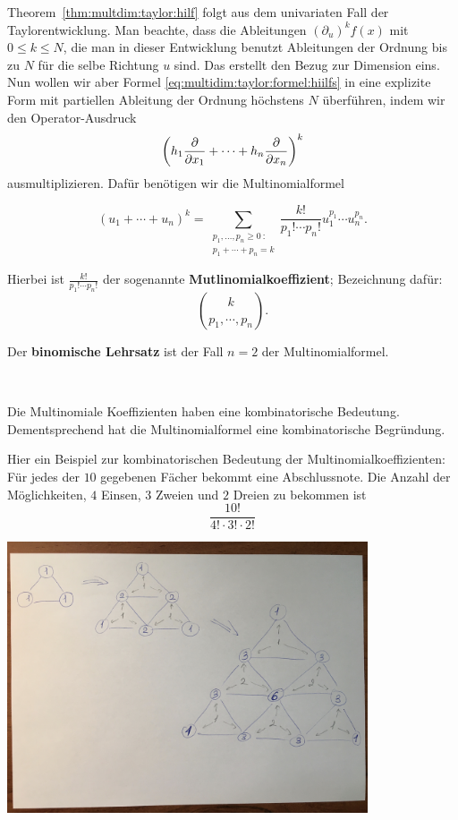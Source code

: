 \begin{bem}
	Theorem~\ref{thm:multdim:taylor:hilf} folgt aus dem univariaten Fall der Taylorentwicklung. Man beachte, dass die Ableitungen $(\partial_u)^k f(x)$ mit $0 \le k \le N$, die man in dieser Entwicklung benutzt Ableitungen der Ordnung bis zu $N$ für die selbe Richtung $u$ sind. Das erstellt den Bezug zur Dimension eins. Nun wollen wir aber Formel \eqref{eq:multidim:taylor:formel:hiilfs} in eine explizite Form mit partiellen Ableitung der Ordnung höchstens $N$ überführen, indem wir den Operator-Ausdruck
	\[
		\left(h_1 \frac{\partial }{\partial x_1} +  \cdots + h_n \frac{\partial }{\partial x_n} \right)^k
	\]
	ausmultiplizieren. Dafür benötigen wir die Multinomialformel

\end{bem} 

\begin{bem}[Multinomialformel]
	\[
		(u_1 + \cdots + u_n)^k =  \sum_{\substack{p_1,\ldots,p_n \ge 0 \ : \\p_1 + \cdots + p_n = k}} \frac{k!}{p_1! \cdots p_n !} u_1^{p_1} \cdots u_n^{p_n}.
	\]

	Hierbei ist $\frac{k!}{p_1! \cdots p_n !}$ der sogenannte \textbf{Mutlinomialkoeffizient}; Bezeichnung dafür: 
	\[
		\binom{k}{p_1 ,\cdots, p_n}. 
	\]
	
	Der \textbf{binomische Lehrsatz} ist der Fall $n=2$ der Multinomialformel. 
\end{bem} 

\begin{bem}
	{\ } 
	
	Die Multinomiale Koeffizienten haben eine kombinatorische Bedeutung. Dementsprechend hat die Multinomialformel eine kombinatorische Begründung. 
	
	Hier ein Beispiel zur kombinatorischen Bedeutung der Multinomialkoeffizienten: Für jedes der $10$ gegebenen Fächer bekommt eine Abschlussnote. Die Anzahl der Möglichkeiten, $4$ Einsen, $3$ Zweien und $2$ Dreien zu bekommen ist 
	\[
		\frac{10!}{ 4! \cdot 3! \cdot 2!} 
	\]
\end{bem} 

\begin{bem}
		\begin{center}
		\includegraphics[width=0.8\textwidth]{pics/mega_pascal.jpg}
	\end{center}
\end{bem} 


